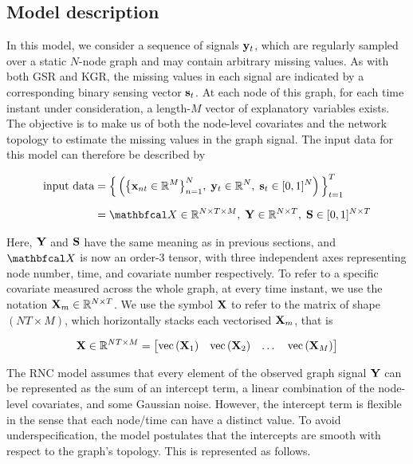 \subsection{Model description}

In this model, we consider a sequence of signals $\mathbf{y}_t$, which are regularly sampled over a static $N$-node graph and may contain arbitrary missing values. As with both GSR and KGR, the missing values in each signal are indicated by a corresponding binary sensing vector $\mathbf{s}_t$. At each node of this graph, for each time instant under consideration, a length-$M$ vector of explanatory variables exists. The objective is to make us of both the node-level covariates and the network topology to estimate the missing values in the graph signal. The input data for this model can therefore be described by 

\begin{align*}
    \text{input data} &= \Big\{ \left( \big\{ \x_{nt} \in \R^M \big\}_{n=1}^N, \; \y_t \in \R^N, \; \s_t \in [0, 1]^N \right)\Big\}_{t=1}^T \\[0.2cm]
    &= \Xt \in \R^{N \times T \times M}, \; \Y \in \R^{N \times T}, \; \Ss \in [0, 1]^{N \times T}
\end{align*}

Here, $\mathbf{Y}$ and $\mathbf{S}$ have the same meaning as in previous sections, and $\Xt$ is now an order-3 tensor, with three independent axes representing node number, time, and covariate number respectively. To refer to a specific covariate measured across the whole graph, at every time instant, we use the notation $\mathbf{X}_m \in \mathbb{R}^{N \times T}$. We use the symbol $\mathbf{X}$ to refer to the matrix of shape $(NT \times M)$, which horizontally stacks each vectorised $\mathbf{X}_m$, that is

\begin{equation*}
    \mathbf{X} \in \mathbb{R}^{NT \times M} = \begin{bmatrix} \text{\textup{vec}}\left(\mathbf{X}_1\right) & \text{\textup{vec}}\left(\mathbf{X}_2\right) & \dots & \text{\textup{vec}}\left(\mathbf{X}_M\right) \end{bmatrix}    
\end{equation*}

The RNC model assumes that every element of the observed graph signal $\mathbf{Y}$ can be represented as the sum of an intercept term, a linear combination of the node-level covariates, and some Gaussian noise. However, the intercept term is flexible in the sense that each node/time can have a distinct value. To avoid underspecification, the model postulates that the intercepts are smooth with respect to the graph's topology. This is represented as follows. 

